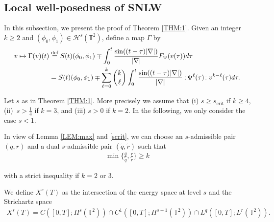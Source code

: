 \documentclass[letterpaper, 11pt,  reqno]{amsart}
\newcommand{\1}{\hspace{0.5mm}\text{I}\hspace{0.5mm}}
\newcommand{\noi}{\noindent}
\newcommand{\T}{\mathbb{T}}
\newcommand{\G}{\Gamma}
\newcommand{\wt}{\widetilde}
\renewcommand{\l}{\ell}
\renewcommand{\H}{\mathcal{H}}
\numberwithin{equation}{section}
\numberwithin{theorem}{section}
\begin{document}
\subsection{Local well-posedness of SNLW}
\label{SUBSEC:3.3}


In this subsection, we present the proof of Theorem \ref{THM:1}.
Given an integer $k \geq 2$ and $(\phi_0, \phi_1) \in \H^s(\T^2)$, define a map $\G$ by 
\begin{align}
v \mapsto \G(v)(t)
& \stackrel{\text{def}}{=} 
S(t) (\phi_0, \phi_1)
 \mp \int_{0}^t  \frac{\sin ((t-\tau)|\nabla|)}{|\nabla|}
    F_\Psi(v(\tau)) d\tau \notag \\
& = S(t) (\phi_0, \phi_1)
 \mp  \sum_{\ell=0}^k {k\choose \ell} \int_{0}^t  \frac{\sin ((t-\tau)|\nabla|)}{|\nabla|}
 :\! \Psi^\l (\tau)  \!: v^{k-\l}(\tau ) d\tau.
\label{SNLW10}
\end{align}


\noi 
Let  $s $ as in Theorem \ref{THM:1}. 
More precisely we assume that  
(i) $ s\geq s_\text{crit} $ if $k \ge 4$, 
(ii)~$ s > \frac14$ if $k=3$, and 
(iii) $s>0$ if $k=2$. 
 In the following, we only consider the case $s < 1$.


In view of Lemma \ref{LEM:max} and \eqref{scrit}, 
we can choose an $s$-admissible pair $(q, r)$ and a dual $s$-admissible pair $(\wt q, \wt r)$
such that 
\begin{align*}
\min\Big\{  \frac{q}{\wt q} ,\frac{r}{\wt r} \Big\} \ge k 
\end{align*}

\noi
with a strict inequality if $k=2$ or $3$.  



We define $X^s(T)$ as the intersection of the energy space at level $s$ and the Strichartz space
\begin{align*}
 X^s(T) = C([0,T];H^s(\T^2))\cap C^1([0,T]; H^{s-1}(\T^2))\cap L^q([0, T]; L^r(\T^2)). 
\end{align*}
\end{document}
